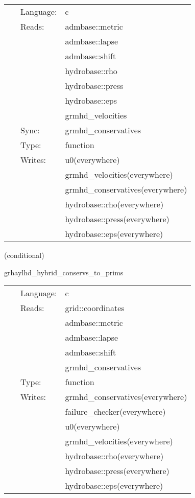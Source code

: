 \hspace{5mm}

 \begin{tabular*}{160mm}{cll} 
~ & Language:  & c \\ 
~ & Reads:  & admbase::metric \\ 
~& ~ &admbase::lapse\\ 
~& ~ &admbase::shift\\ 
~& ~ &hydrobase::rho\\ 
~& ~ &hydrobase::press\\ 
~& ~ &hydrobase::eps\\ 
~& ~ &grmhd\_velocities\\ 
~ & Sync:  & grmhd\_conservatives \\ 
~ & Type:  & function \\ 
~ & Writes:  & u0(everywhere) \\ 
~& ~ &grmhd\_velocities(everywhere)\\ 
~& ~ &grmhd\_conservatives(everywhere)\\ 
~& ~ &hydrobase::rho(everywhere)\\ 
~& ~ &hydrobase::press(everywhere)\\ 
~& ~ &hydrobase::eps(everywhere)\\ 
\end{tabular*} 


\vspace{5mm}

   (conditional) 

\hspace{5mm} grhaylhd\_hybrid\_conservs\_to\_prims 

\hspace{5mm}{\it hybrid version of grhaylhd\_conservs\_to\_prims } 


\hspace{5mm}

 \begin{tabular*}{160mm}{cll} 
~ & Language:  & c \\ 
~ & Reads:  & grid::coordinates \\ 
~& ~ &admbase::metric\\ 
~& ~ &admbase::lapse\\ 
~& ~ &admbase::shift\\ 
~& ~ &grmhd\_conservatives\\ 
~ & Type:  & function \\ 
~ & Writes:  & grmhd\_conservatives(everywhere) \\ 
~& ~ &failure\_checker(everywhere)\\ 
~& ~ &u0(everywhere)\\ 
~& ~ &grmhd\_velocities(everywhere)\\ 
~& ~ &hydrobase::rho(everywhere)\\ 
~& ~ &hydrobase::press(everywhere)\\ 
~& ~ &hydrobase::eps(everywhere)\\ 
\end{tabular*} 


